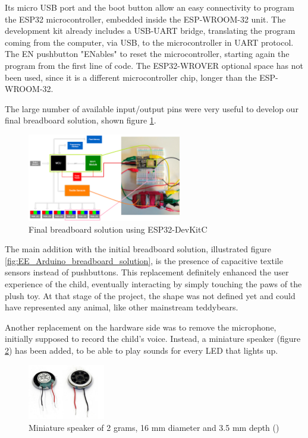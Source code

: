 Its micro USB port and the boot button allow an easy connectivity to program the ESP32 microcontroller, embedded inside the ESP-WROOM-32 unit. The development kit already includes a USB-UART bridge, translating the program coming from the computer, via USB, to the microcontroller in UART protocol. The EN pushbutton "ENables" to reset the microcontroller, starting again the program from the first line of code. The ESP32-WROVER optional space has not been used, since it is a different microcontroller chip, longer than the ESP-WROOM-32. 

\medskip The large number of available input/output pins were very useful to develop our final breadboard solution, shown figure \ref{fig:ESP32_breadboard_solution}.

\begin{figure}[H]
    \centering
    \includegraphics[width=0.6\textwidth]{images/EE_ESP32_breadboard_solution.png}
    \caption{Final breadboard solution using ESP32-DevKitC}
    \label{fig:ESP32_breadboard_solution}
\end{figure}

The main addition with the initial breadboard solution, illustrated figure \ref{fig:EE_Arduino_breadboard_solution}, is the presence of capacitive textile sensors instead of pushbuttons. This replacement definitely enhanced the user experience of the child, eventually interacting by simply touching the paws of the plush toy. At that stage of the project, the shape was not defined yet and could have represented any animal, like other mainstream teddybears.

\medskip Another replacement on the hardware side was to remove the microphone, initially supposed to record the child's voice. Instead, a miniature speaker (figure \ref{fig:MiniatureSpeaker}) has been added, to be able to play sounds for every LED that lights up. 

\begin{figure}[H]
    \centering
    \includegraphics[width=0.3\textwidth]{images/EE_MiniatureSpeaker.PNG}
    \caption{Miniature speaker of 2 grams, 16 mm diameter and 3.5 mm depth (\cite{minispeakerspec})}
    \label{fig:MiniatureSpeaker}
\end{figure}

